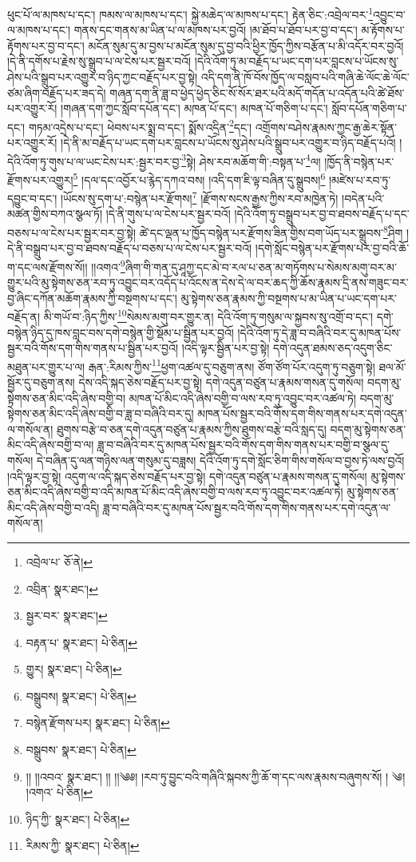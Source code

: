 ཕུང་པོ་ལ་མཁས་པ་དང་། ཁམས་ལ་མཁས་པ་དང་། སྐྱེ་མཆེད་ལ་མཁས་པ་དང་། རྟེན་ཅིང་:འབྲེལ་བར་\footnote{འབྲེལ་པ་  ཅོ་ནེ། }འབྱུང་བ་ལ་མཁས་པ་དང་། གནས་དང་གནས་མ་ཡིན་པ་ལ་མཁས་པར་བྱའོ། །མ་ཐོབ་པ་ཐོབ་པར་བྱ་བ་དང་། མ་རྟོགས་པ་རྟོགས་པར་བྱ་བ་དང་། མངོན་སུམ་དུ་མ་བྱས་པ་མངོན་སུམ་དུ་བྱ་བའི་ཕྱིར་ཁྱོད་ཀྱིས་བརྩོན་པ་མི་འདོར་བར་བྱའོ། །དེ་ནི་དགོས་པ་རྗེས་སུ་སྒྲུབ་པ་ལ་ངེས་པར་སྦྱར་བའོ། །དེའི་འོག་ཏུ་མ་བརྗོད་པ་ཡང་དག་པར་བླངས་པ་ཡོངས་སུ་ཤེས་པའི་སྒྲུབ་པར་འགྱུར་བ་ཉིད་ཀྱང་བརྗོད་པར་བྱ་སྟེ། འདི་དག་ནི་ཁོ་བོས་ཁྱོད་ལ་བསླབ་པའི་གཞི་ཆེ་ལོང་ཆེ་ལོང་ཙམ་ཞིག་བརྗོད་པར་ཟད་དེ། གཞན་དག་ནི་ཟླ་བ་ཕྱེད་ཕྱེད་ཅིང་སོ་སོར་ཐར་པའི་མདོ་གདོན་པ་འདོན་པའི་ཚེ་ཐོས་པར་འགྱུར་རོ། །གཞན་དག་ཀྱང་སློབ་དཔོན་དང་། མཁན་པོ་དང་། མཁན་པོ་གཅིག་པ་དང་། སློབ་དཔོན་གཅིག་པ་དང་། གཏམ་འདྲེས་པ་དང་། ཕེབས་པར་སྨྲ་བ་དང་། སྨོས་འདྲིན་\footnote{འབྲིན་  སྣར་ཐང་། }དང་། འགྲོགས་བཤེས་རྣམས་ཀྱང་རྒྱ་ཆེར་སྟོན་པར་འགྱུར་རོ། །དེ་ནི་མ་བརྗོད་པ་ཡང་དག་པར་བླངས་པ་ཡོངས་སུ་ཤེས་པའི་སྒྲུབ་པར་འགྱུར་བ་ཉིད་བརྗོད་པའོ། །དེའི་འོག་ཏུ་གུས་པ་ལ་ཡང་ངེས་པར་:སྦྱར་བར་བྱ་\footnote{སྦྱར་བར་  སྣར་ཐང་། }སྟེ། ཤེས་རབ་མཆོག་གི་:བསྟན་པ་\footnote{བརྟན་པ་  སྣར་ཐང་།  པེ་ཅིན། }ལ། །ཁྱོད་ནི་བསྙེན་པར་རྫོགས་པར་འགྱུར།\footnote{གྱུར།  སྣར་ཐང་།  པེ་ཅིན། } །དལ་དང་འབྱོར་པ་རྙེད་དཀའ་བས། །འདི་དག་ཇི་ལྟ་བཞིན་དུ་སྒྲུབས།\footnote{བསྒྲུབས།  སྣར་ཐང་།  པེ་ཅིན། } །མཛེས་པ་རབ་ཏུ་དབྱུང་བ་དང་། །ཡོངས་སུ་དག་པ་:བསྙེན་པར་རྫོགས།\footnote{བསྙེན་རྫོགས་པར།  སྣར་ཐང་།  པེ་ཅིན། } །རྫོགས་སངས་རྒྱས་ཀྱིས་རབ་མཁྱེན་ཏེ། །བདེན་པའི་མཚན་གྱིས་བཀའ་སྩལ་ཏོ། །དེ་ནི་གུས་པ་ལ་ངེས་པར་སྦྱར་བའོ། །དེའི་འོག་ཏུ་བསྒྲུབ་པར་བྱ་བ་ཐབས་བརྗོད་པ་དང་བཅས་པ་ལ་ངེས་པར་སྦྱར་བར་བྱ་སྟེ། ཚེ་དང་ལྡན་པ་ཁྱོད་བསྙེན་པར་རྫོགས་ཟིན་གྱིས་བག་ཡོད་པར་སྒྲུབས་\footnote{བསྒྲུབས་  སྣར་ཐང་།  པེ་ཅིན། }ཤིག །དེ་ནི་བསྒྲུབ་པར་བྱ་བ་ཐབས་བརྗོད་པ་བཅས་པ་ལ་ངེས་པར་སྦྱར་བའོ། །དགེ་སློང་བསྙེན་པར་རྫོགས་པར་བྱ་བའི་ཆོ་ག་དང་ལས་རྫོགས་སོ།། །།འགའ་\footnote{།། །།འབའ་  སྣར་ཐང་། །། །།༄༅། །རབ་ཏུ་བྱུང་བའི་གཞིའི་སྐབས་ཀྱི་ཆོ་ག་དང་ལས་རྣམས་བཞུགས་སོ། ། ༄། །འགའ་  པེ་ཅིན། }ཞིག་གི་གན་དུ་ཤཱཀྱ་དང་མེ་བ་རལ་པ་ཅན་མ་གཏོགས་པ་སེམས་མགུ་བར་མ་གྱུར་པའི་མུ་སྟེགས་ཅན་རབ་ཏུ་འབྱུང་བར་འདོད་པ་འོངས་ན་དེས་དེ་ལ་བར་ཆད་ཀྱི་ཆོས་རྣམས་དྲི་ནས་གཟུང་བར་བྱ་ཞིང་དཀོན་མཆོག་རྣམས་ཀྱི་བསྔགས་པ་དང་། མུ་སྟེགས་ཅན་རྣམས་ཀྱི་བསྔགས་པ་མ་ཡིན་པ་ཡང་དག་པར་བརྗོད་ན། མི་གཡོ་བ་:ཉིད་ཀྱིས་\footnote{ཉིད་ཀྱི་  སྣར་ཐང་།  པེ་ཅིན། }སེམས་མགུ་བར་གྱུར་ན། དེའི་འོག་ཏུ་གསུམ་ལ་སྐྱབས་སུ་འགྲོ་བ་དང་། དགེ་བསྙེན་ཉིད་དུ་ཁས་བླང་བས་དགེ་བསྙེན་གྱི་སྡོམ་པ་སྦྱིན་པར་བྱའོ། །དེའི་འོག་ཏུ་དེ་ཟླ་བ་བཞིའི་བར་དུ་མཁན་པོས་སྦྱར་བའི་གོས་དག་གིས་གནས་པ་སྦྱིན་པར་བྱའོ། །འདི་ལྟར་སྦྱིན་པར་བྱ་སྟེ། དགེ་འདུན་ཐམས་ཅད་འདུག་ཅིང་མཐུན་པར་གྱུར་པ་ལ། རྒན་:རིམས་ཀྱིས་\footnote{རིམས་ཀྱི་  སྣར་ཐང་།  པེ་ཅིན། }ཕྱག་འཚལ་དུ་བཅུག་ནས། ཙོག་ཙོག་པོར་འདུག་ཏུ་བཅུག་སྟེ། ཐལ་མོ་སྦྱོར་དུ་བཅུག་ནས། དེས་འདི་སྐད་ཅེས་བརྗོད་པར་བྱ་སྟེ། དགེ་འདུན་བཙུན་པ་རྣམས་གསན་དུ་གསོལ། བདག་མུ་སྟེགས་ཅན་མིང་འདི་ཞེས་བགྱི་བ། མཁན་པོ་མིང་འདི་ཞེས་བགྱི་བ་ལས་རབ་ཏུ་འབྱུང་བར་འཚལ་ཏེ། བདག་མུ་སྟེགས་ཅན་མིང་འདི་ཞེས་བགྱི་བ་ཟླ་བ་བཞིའི་བར་དུ། མཁན་པོས་སྦྱར་བའི་གོས་དག་གིས་གནས་པར་དགེ་འདུན་ལ་གསོལ་ན། ཐུགས་བརྩེ་བ་ཅན་དགེ་འདུན་བཙུན་པ་རྣམས་ཀྱིས་ཐུགས་བརྩེ་བའི་སླད་དུ། བདག་མུ་སྟེགས་ཅན་མིང་འདི་ཞེས་བགྱི་བ་ལ། ཟླ་བ་བཞིའི་བར་དུ་མཁན་པོས་སྦྱར་བའི་གོས་དག་གིས་གནས་པར་བགྱི་བ་སྩལ་དུ་གསོལ། དེ་བཞིན་དུ་ལན་གཉིས་ལན་གསུམ་དུ་བཟླས། དེའི་འོག་ཏུ་དགེ་སློང་ཅིག་གིས་གསོལ་བ་བྱས་ཏེ་ལས་བྱའོ། །འདི་ལྟར་བྱ་སྟེ། འདུག་ལ་འདི་སྐད་ཅེས་བརྗོད་པར་བྱ་སྟེ། དགེ་འདུན་བཙུན་པ་རྣམས་གསན་དུ་གསོལ། མུ་སྟེགས་ཅན་མིང་འདི་ཞེས་བགྱི་བ་འདི་མཁན་པོ་མིང་འདི་ཞེས་བགྱི་བ་ལས་རབ་ཏུ་འབྱུང་བར་འཚལ་ཏེ། མུ་སྟེགས་ཅན་མིང་འདི་ཞེས་བགྱི་བ་འདི། ཟླ་བ་བཞིའི་བར་དུ་མཁན་པོས་སྦྱར་བའི་གོས་དག་གིས་གནས་པར་དགེ་འདུན་ལ་གསོལ་ན། 